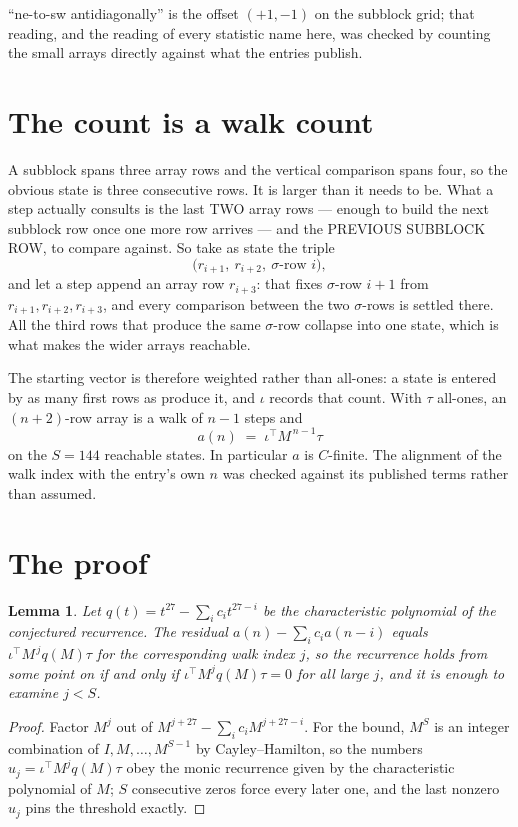 \documentclass[11pt,a4paper]{article}
\theoremstyle{plain}
\newtheorem{lemma}[theorem]{Lemma}
\theoremstyle{definition}
\begin{document}
``ne-to-sw antidiagonally'' is the offset $(+1,-1)$ on the subblock grid; that reading, and
the reading of every statistic name here, was checked by counting the small arrays directly
against what the entries publish.

\section{The count is a walk count}

A subblock spans three array rows and the vertical comparison spans four, so the obvious state
is three consecutive rows. It is larger than it needs to be. What a step actually consults is
the last TWO array rows --- enough to build the next subblock row once one more row arrives ---
and the PREVIOUS SUBBLOCK ROW, to compare against. So take as state the triple
\[
\bigl(r_{i+1},\ r_{i+2},\ \sigma\text{-row }i\bigr),
\]
and let a step append an array row $r_{i+3}$: that fixes $\sigma$-row $i+1$ from
$r_{i+1},r_{i+2},r_{i+3}$, and every comparison between the two $\sigma$-rows is settled
there. All the third rows that produce the same $\sigma$-row collapse into one state, which is
what makes the wider arrays reachable.

The starting vector is therefore weighted rather than all-ones: a state is entered by as many
first rows as produce it, and $\iota$ records that count. With $\tau$ all-ones, an
$(n+2)$-row array is a walk of $n-1$ steps and
\[
a(n)\;=\;\iota^{\!\top}M^{\,n-1}\tau
\]
on the $S=144$ reachable states. In particular $a$ is $C$-finite. The alignment of the walk
index with the entry's own $n$ was checked against its published terms rather than assumed.

\section{The proof}

\begin{lemma}\label{lem:crit}
Let $q(t)=t^{27}-\sum_i c_it^{27-i}$ be the characteristic polynomial of the
conjectured recurrence. The residual $a(n)-\sum_ic_ia(n-i)$ equals
$\iota^{\!\top}M^{\,j}q(M)\tau$ for the corresponding walk index $j$, so the recurrence
holds from some point on if and only if $\iota^{\!\top}M^{j}q(M)\tau=0$ for all large $j$,
and it is enough to examine $j<S$.
\end{lemma}

\begin{proof}
Factor $M^{j}$ out of $M^{j+27}-\sum_ic_iM^{j+27-i}$. For the bound, $M^{S}$
is an integer combination of $I,M,\dots,M^{S-1}$ by Cayley--Hamilton, so the numbers
$u_j=\iota^{\!\top}M^{j}q(M)\tau$ obey the monic recurrence given by the characteristic
polynomial of $M$; $S$ consecutive zeros force every later one, and the last nonzero $u_j$
pins the threshold exactly.
\end{proof}
\end{document}
